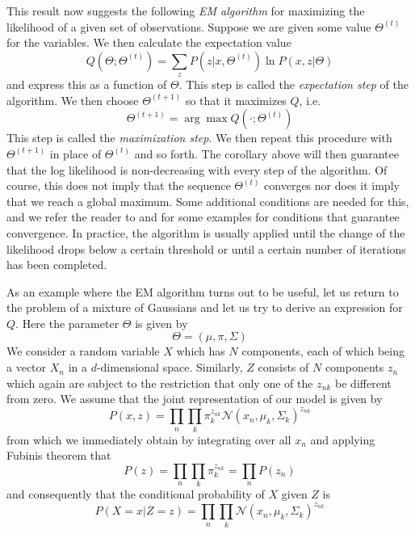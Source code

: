 \documentclass[a4paper, draft]{article}
\theoremstyle{own}
\theoremstyle{remark}
\begin{document}
This result now suggests the following  {\em EM algorithm} for maximizing the likelihood of a given set of observations. Suppose we are given some value $\Theta^{(t)}$ for the variables. We then calculate the expectation value
$$
Q(\Theta ; \Theta^{(t)}) = \sum_z  P(z | x, \Theta^{(t)}) \ln P(x,z | \Theta)  
$$
and express this as a function of $\Theta$. This step is called the {\em expectation step} of the algorithm. We then choose $\Theta^{(t+1)}$ so that it maximizes $Q$, i.e.
$$
\Theta^{(t+1)} =  \arg \max Q(\cdot ; \Theta^{(t)})
$$
This step is called the {\em maximization step}. We then repeat this procedure with $\Theta^{(t+1)}$ in place of $\Theta^{(t)}$ and so forth. The corollary above will then guarantee that the log likelihood is non-decreasing with every step of the algorithm. Of course, this does not imply that the sequence $\Theta^{(t)}$ converges nor does it imply that we reach a global maximum. Some additional conditions are needed for this, and we refer the reader to \cite{Dempster77} and \cite{RobertCasella1999} for some examples for conditions that guarantee convergence. In practice, the algorithm is usually applied until the change of the likelihood drops below a certain threshold or until a certain number of iterations has been completed.

As an example where the EM algorithm turns out to be useful, let us return to the problem of a mixture of Gaussians and let us try to derive an expression for $Q$. Here the parameter $\Theta$ is given by 
$$
\Theta = (\mu, \pi, \Sigma)
$$
We consider a random variable $X$ which has $N$ components, each of which being a vector $X_n$ in a $d$-dimensional space. Similarly, $Z$ consists of $N$ components $z_n$ which again are subject to the restriction that only one of the $z_{nk}$ be different from zero. We assume that the joint representation of our model is given by
$$
P(x , z) = \prod_n \prod_k \pi_k^{z_{nk}}{\mathcal N} (x_n, \mu_k , \Sigma_k)^{z_{nk}}
$$
from which we immediately obtain by integrating over all $x_n$ and applying Fubinis theorem that
$$
P(z) = \prod_n \prod_k \pi_k^{z_{nk}} = \prod_n P(z_n)
$$ and consequently that
the conditional probability of $X$ given $Z$ 
is 
$$
P(X = x | Z = z) = \prod_n \prod_k {\mathcal N} (x_n, \mu_k , \Sigma_k)^{z_{nk}}
$$
\end{document}
